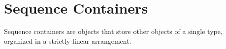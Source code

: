 
\cleardoublepage
\chapter{Sequence Containers}

Sequence containers are objects that store other objects of a single type,
organized in a strictly linear arrangement.



\newpage


\newpage

